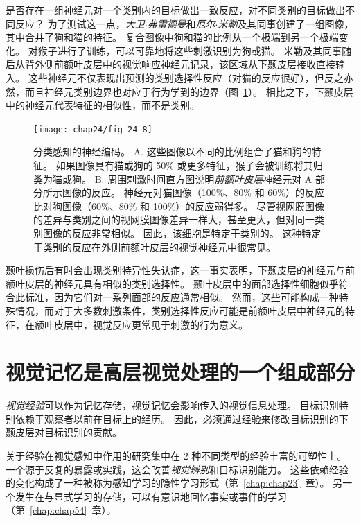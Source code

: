是否存在一组神经元对一个类别内的目标做出一致反应，对不同类别的目标做出不同反应？
为了测试这一点，\textit{大卫$\cdot$弗雷德曼}和\textit{厄尔$\cdot$米勒}及其同事创建了一组图像，其中合并了狗和猫的特征。
复合图像中狗和猫的比例从一个极端到另一个极端变化。 
对猴子进行了训练，可以可靠地将这些刺激识别为狗或猫。
米勒及其同事随后从背外侧前额叶皮层中的视觉响应神经元记录，该区域从下颞皮层接收直接输入。
这些神经元不仅表现出预测的类别选择性反应（对猫的反应很好），但反之亦然，而且神经元类别边界也对应于行为学到的边界（图~\ref{fig:24_8}）。 
相比之下，下颞皮层中的神经元代表特征的相似性，而不是类别。


\begin{figure}[htbp]
	\centering
	\texttt{[image: chap24/fig\_24\_8]}
	\caption{分类感知的神经编码。
		A. 这些图像以不同的比例组合了猫和狗的特征。
		如果图像具有猫或狗的 50\% 或更多特征，猴子会被训练将其归类为猫或狗。
		B. 周围刺激时间直方图说明\textit{前额叶皮层}神经元对 A 部分所示图像的反应。
		神经元对猫图像（100\%、80\% 和 60\%）的反应比对狗图像（60\%、80\% 和 100\%）的反应弱得多。
		尽管视网膜图像的差异与类别之间的视网膜图像差异一样大，甚至更大，但对同一类别图像的反应非常相似。
		因此，该细胞是特定于类别的。
		这种特定于类别的反应在外侧前额叶皮层的视觉神经元中很常见。}
	\label{fig:24_8}
\end{figure}


颞叶损伤后有时会出现类别特异性失认症，这一事实表明，下颞皮层的神经元与前额叶皮层的神经元具有相似的类别选择性。
颞叶皮层中的面部选择性细胞似乎符合此标准，因为它们对一系列面部的反应通常相似。
然而，这些可能构成一种特殊情况，而对于大多数刺激条件，类别选择性反应可能是前额叶皮层中神经元的特征，在额叶皮层中，视觉反应更常见于刺激的行为意义。



\section{视觉记忆是高层视觉处理的一个组成部分}

\textit{视觉经验}可以作为记忆存储，视觉记忆会影响传入的视觉信息处理。
目标识别特别依赖于观察者以前在目标上的经历。
因此，必须通过经验来修改目标识别的下颞皮层对目标识别的贡献。


关于经验在视觉感知中作用的研究集中在 2 种不同类型的经验丰富的可塑性上。
一个源于反复的暴露或实践，这会改善\textit{视觉辨别}和目标识别能力。
这些依赖经验的变化构成了一种被称为感知学习的隐性学习形式（第~\ref{chap:chap23}~章）。
另一个发生在与显式学习的存储，可以有意识地回忆事实或事件的学习（第~\ref{chap:chap54}~章）。



